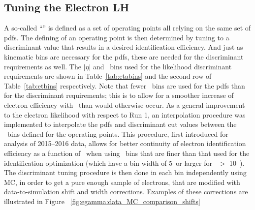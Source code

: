 \subsection{Tuning the Electron LH}\label{sec:egamma:tuning}
A so-called ``\tune'' is defined as a set of operating points all relying on the same set of pdfs. 
The defining of an operating point is then determined by tuning to a discriminant value that results in a desired identification efficiency.
And just as kinematic bins are necessary for the pdfs, these are needed for the discriminant requirements as well.
The $|\eta|$ and \Et\ bins used for the likelihood discriminant requirements are shown in Table~\ref{tab:etabins} and the second row of Table~\ref{tab:etbins} respectively.
Note that fewer \Et\ bins are used for the pdfs than for the discriminant requirements; this is to allow for a smoother increase of electron efficiency with \et\ than would otherwise occur.
As a general improvement to the electron likelihood with respect to Run 1, an interpolation procedure was implemented to interpolate the pdfs and discriminant cut values between the \et\ bins defined for the operating points.
This procedure, first introduced for analysis of 2015–2016 data, allows for better continuity of electron identification efficiency as a function of \et\ when using \et\ bins that are finer than that used for the identification optimization (which have a bin width of 5~\GeV or larger for \et\ $>$ 10~\GeV).
The discriminant tuning procedure is then done in each bin independently using MC, in order to get a pure enough sample of electrons, that are modified with data-to-simulation shift and width corrections.
Examples of these corrections are illustrated in Figure ~\ref{fig:egamma:data_MC_comparison_shifts}
